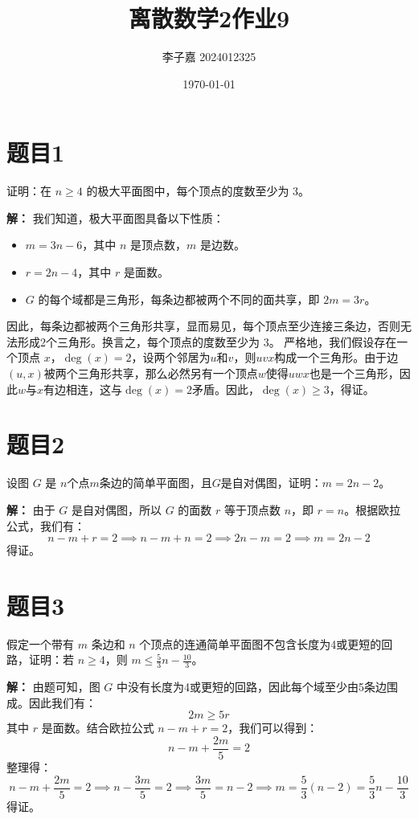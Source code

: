 \documentclass[utf8]{ctexart}
\title{\textbf{离散数学2\quad 作业9}}
\date{\today}
\author{李子嘉 2024012325}
\theoremstyle{mystyle}
\begin{document}
\maketitle

\section*{题目1}

\begin{problembox}
  证明：在 $n \geq 4$ 的极大平面图中，每个顶点的度数至少为 $3$。
\end{problembox}
\textbf{解：} 
我们知道，极大平面图具备以下性质：
\begin{itemize}
  \item $ m = 3n - 6 $，其中 $n$ 是顶点数，$m$ 是边数。
  \item $ r = 2n - 4 $，其中 $r$ 是面数。
  \item $G$ 的每个域都是三角形，每条边都被两个不同的面共享，即 $2m = 3r$。
\end{itemize}
因此，每条边都被两个三角形共享，显而易见，每个顶点至少连接三条边，否则无法形成2个三角形。换言之，每个顶点的度数至少为 $3$。
严格地，我们假设存在一个顶点 $x$，$\deg(x) = 2$，设两个邻居为$u$和$v$，则$uvx$构成一个三角形。由于边$(u,x)$被两个三角形共享，那么必然另有一个顶点$w$使得$uwx$也是一个三角形，因此$w$与$x$有边相连，这与$\deg(x) = 2$矛盾。因此，$\deg(x) \geq 3$，得证。

\section*{题目2}
\begin{problembox}
设图 $G$ 是 $n$个点$m$条边的简单平面图，且$G$是自对偶图，证明：$m=2n-2$。
\end{problembox}
\textbf{解：}
由于 $G$ 是自对偶图，所以 $G$ 的面数 $r$ 等于顶点数 $n$，即 $r = n$。根据欧拉公式，我们有：
\[n - m + r = 2 \implies n - m + n = 2 \implies 2n - m = 2 \implies m = 2n - 2\]
得证。

\section*{题目3}
\begin{problembox}
假定一个带有 $m$ 条边和 $n$ 个顶点的连通简单平面图不包含长度为4或更短的回路，证明：若 $n \geq 4$，则 $m \leq \frac{5}{3}n - \frac{10}{3}$。
\end{problembox}
\textbf{解：}
由题可知，图 $G$ 中没有长度为4或更短的回路，因此每个域至少由5条边围成。因此我们有：
\[2m \geq 5r\]
其中 $r$ 是面数。结合欧拉公式 $n - m + r = 2$，我们可以得到：
\[n - m + \frac{2m}{5} = 2\]
整理得：
\[n - m + \frac{2m}{5} = 2 \implies n - \frac{3m}{5} = 2 \implies \frac{3m}{5} = n - 2 \implies m = \frac{5}{3}(n - 2) = \frac{5}{3}n - \frac{10}{3}\]
得证。
\end{document}
